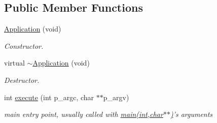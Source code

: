 \subsection*{Public Member Functions}
\begin{DoxyCompactItemize}
\item 
\hyperlink{classxtd_1_1Application_a2d911d40f42dc2928275538541b91633}{Application} (void)
\begin{DoxyCompactList}\small\item\em Constructor. \end{DoxyCompactList}\item 
virtual \hyperlink{classxtd_1_1Application_a3ae7e81534c6ca594339e3e098183df4}{$\sim$\-Application} (void)
\begin{DoxyCompactList}\small\item\em Destructor. \end{DoxyCompactList}\item 
int \hyperlink{classxtd_1_1Application_ae9241351a9caefa4b96bc906d3db144c}{execute} (int p\-\_\-argc, char $\ast$$\ast$p\-\_\-argv)
\begin{DoxyCompactList}\small\item\em main entry point, usually called with \hyperlink{doc_2example_2Application_8hh_a6b77b2233054447db17959182b5fb02b}{main(int,char$\ast$$\ast$)}'s arguments \end{DoxyCompactList}\end{DoxyCompactItemize}
